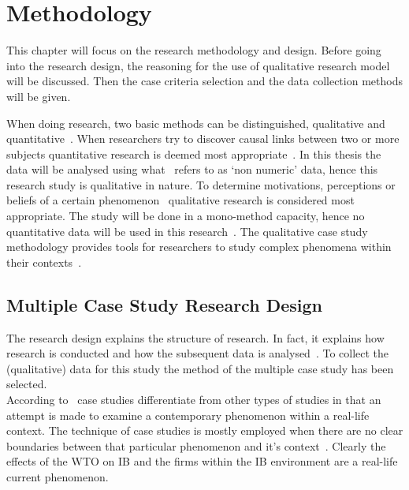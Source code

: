 \chapter{Methodology}
This chapter will focus on the research methodology and design.
Before going into the research design, the reasoning for the use of qualitative research model will be discussed.
Then the case criteria selection and the data collection methods will be given.

When doing research, two basic methods can be distinguished, qualitative and quantitative~\citep{Saunders:2009wn}.
When researchers try to discover causal links between two or more subjects quantitative research is deemed most appropriate~\citep{van2008management}.
In this thesis the data will be analysed using what~\citep{Saunders:2009wn} refers to as `non numeric' data, hence this research study is qualitative in nature.
To determine motivations, perceptions or beliefs of a certain phenomenon~\citep{van2008management,Eisenhardt:1989ww} qualitative research is considered most appropriate.
The study will be done in a mono-method capacity, hence no quantitative data will be used in this research~\citep{Saunders:2009wn}.
The qualitative case study methodology provides tools for researchers to study complex phenomena within their contexts~\citep{Baxter:2008vu,Ryan:2003hn}.\\
\section{Multiple Case Study Research Design}

The research design explains the structure of research. 
In fact, it explains how research is conducted and how the subsequent data is analysed~\citep{van2008management}.
To collect the (qualitative) data for this study the method of the multiple case study has been selected.\\
According to~\cite{Yin:2009vh} case studies differentiate from other types of studies in that an attempt is made to examine a contemporary phenomenon within a real-life context. 
The technique of case studies is mostly employed when there are no clear boundaries between that particular phenomenon and it’s context~\citep{Yin:2009vh,Marshall:1996wc}.
Clearly the effects of the WTO on \gls{IB} and the firms within the \gls{IB} environment are a real-life current phenomenon. 

